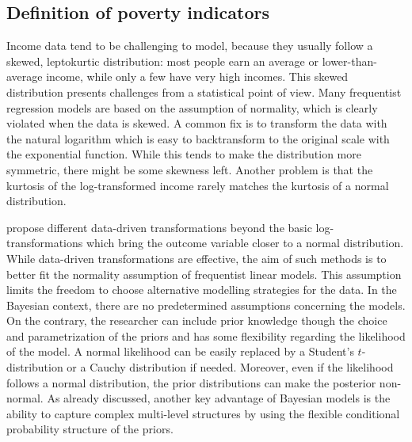 \subsection{Definition of poverty indicators}
Income data tend to be challenging to model, because they usually follow a skewed, leptokurtic distribution: most people earn an average or lower-than-average income, while only a few have very high incomes. This skewed distribution presents challenges from a statistical point of view. Many frequentist regression models are based on the assumption of normality, which is clearly violated when the data is skewed.
A common fix is to transform the data with the natural logarithm which is easy to backtransform to the original scale with the exponential function. While this tends to make the distribution more symmetric, there might be some skewness left. Another problem is that the kurtosis of the log-transformed income rarely matches the kurtosis of a normal distribution.

\cite{rojas_perilla_data_2020} propose different data-driven transformations beyond the basic log-transformations which bring the outcome variable closer to a normal distribution. While data-driven transformations are effective, the aim of such methods is to better fit the normality assumption of frequentist linear models. This assumption limits the freedom to choose alternative modelling strategies for the data. In the Bayesian context, there are no predetermined assumptions concerning the models. On the contrary, the researcher can include prior knowledge though the choice and parametrization of the priors and has some flexibility regarding the likelihood of the model. A normal likelihood can be easily replaced by a Student's $t$-distribution or a Cauchy distribution if needed. Moreover, even if the likelihood follows a normal distribution, the prior distributions can make the posterior non-normal. As already discussed, another key advantage of Bayesian models is the ability to capture complex multi-level structures by using the flexible conditional probability structure of the priors.


